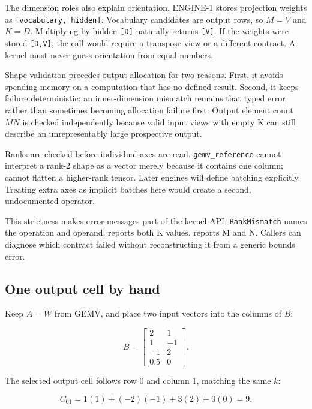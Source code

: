 \documentclass[
  10pt,
]{article}
\begin{document}
The dimension roles also explain orientation. ENGINE-1 stores projection
weights as \texttt{{[}vocabulary,\ hidden{]}}. Vocabulary candidates are
output rows, so \(M=V\) and \(K=D\). Multiplying by hidden
\texttt{{[}D{]}} naturally returns \texttt{{[}V{]}}. If the weights were
stored \texttt{{[}D,V{]}}, the call would require a transpose view or a
different contract. A kernel must never guess orientation from equal
numbers.

Shape validation precedes output allocation for two reasons. First, it
avoids spending memory on a computation that has no defined result.
Second, it keeps failure deterministic: an inner-dimension mismatch
remains that typed error rather than sometimes becoming allocation
failure first. Output element count \(MN\) is checked independently
because valid input views with empty K can still describe an
unrepresentably large prospective output.

Ranks are checked before individual axes are read.
\texttt{gemv\_reference} cannot interpret a rank-2 shape as a vector
merely because it contains one column;
\texttt{} cannot flatten a higher-rank
tensor. Later engines will define batching explicitly. Treating extra
axes as implicit batches here would create a second, undocumented
operator.

This strictness makes error messages part of the kernel API.
\texttt{RankMismatch} names the operation and operand.
\texttt{} reports both K values.
\texttt{} reports M and N. Callers can
diagnose which contract failed without reconstructing it from a generic
bounds error.

\subsection{One output cell by hand}\label{one-output-cell-by-hand}

Keep \(A=W\) from GEMV, and place two input vectors into the columns of
\(B\):

\[
B=
\begin{bmatrix}
2&1\\
1&-1\\
-1&2\\
0.5&0
\end{bmatrix}.
\]

The selected output cell follows row 0 and column 1, matching the same
\(k\):

\[
C_{01}=1(1)+(-2)(-1)+3(2)+0(0)=9.
\]
\end{document}
